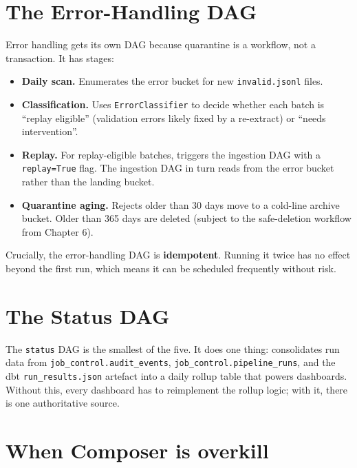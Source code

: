 \documentclass[
  11pt,
  british,
  oneside]{book}
\providecommand{\tightlist}{%
  \setlength{\itemsep}{0pt}\setlength{\parskip}{0pt}}
\begin{document}
\hypertarget{the-error-handling-dag}{%
\section{The Error-Handling DAG}\label{the-error-handling-dag}}

Error handling gets its own DAG because quarantine is a workflow, not a
transaction. It has stages:

\begin{itemize}
\tightlist
\item
  \textbf{Daily scan.} Enumerates the error bucket for new
  \texttt{invalid.jsonl} files.
\item
  \textbf{Classification.} Uses \texttt{ErrorClassifier} to decide
  whether each batch is ``replay eligible'' (validation errors likely
  fixed by a re-extract) or ``needs intervention''.
\item
  \textbf{Replay.} For replay-eligible batches, triggers the ingestion
  DAG with a \texttt{replay=True} flag. The ingestion DAG in turn reads
  from the error bucket rather than the landing bucket.
\item
  \textbf{Quarantine aging.} Rejects older than 30 days move to a
  cold-line archive bucket. Older than 365 days are deleted (subject to
  the safe-deletion workflow from Chapter 6).
\end{itemize}

Crucially, the error-handling DAG is \textbf{idempotent}. Running it
twice has no effect beyond the first run, which means it can be
scheduled frequently without risk.

\hypertarget{the-status-dag}{%
\section{The Status DAG}\label{the-status-dag}}

The \texttt{status} DAG is the smallest of the five. It does one thing:
consolidates run data from \texttt{job\_control.audit\_events},
\texttt{job\_control.pipeline\_runs}, and the dbt
\texttt{run\_results.json} artefact into a daily rollup table that
powers dashboards. Without this, every dashboard has to reimplement the
rollup logic; with it, there is one authoritative source.

\hypertarget{when-composer-is-overkill}{%
\section{When Composer is overkill}\label{when-composer-is-overkill}}
\end{document}
